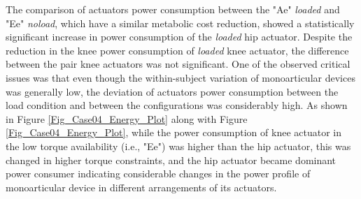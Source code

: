 \documentclass[10pt,letterpaper]{article}
\begin{document}
The comparison of actuators power consumption between the "Ae" {\it loaded} and "Ee" {\it noload}, which have a similar metabolic cost reduction, showed a statistically significant increase in power consumption of the {\it loaded} hip actuator. Despite the reduction in the knee power consumption of {\it loaded} knee actuator, the difference between the pair knee actuators was not significant. One of the observed critical issues was that even though the within-subject variation of monoarticular devices was generally low, the deviation of actuators power consumption between the load condition and between the configurations was considerably high. As shown in Figure \ref{Fig_Case04_Energy_Plot} along with Figure \ref{Fig_Case04_Energy_Plot}, while the power consumption of knee actuator in the low torque availability (i.e., "Ee") was higher than the hip actuator, this was changed in higher torque constraints, and the hip actuator became dominant power consumer indicating considerable changes in the power profile of monoarticular device in different arrangements of its actuators.\\
\end{document}
